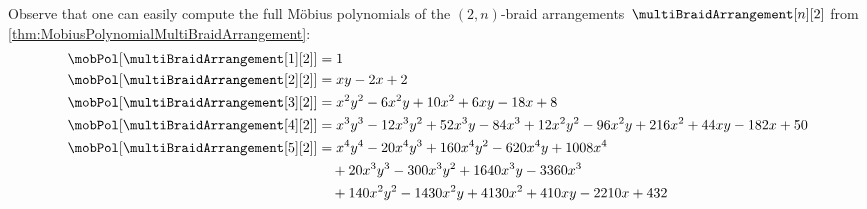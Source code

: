 Observe that one can easily compute the full M\"obius polynomials of the $(2,n)$-braid arrangements~$\multiBraidArrangement[n][2]$ from \cref{thm:MobiusPolynomialMultiBraidArrangement}:
\begin{align*}
\mobPol[{\multiBraidArrangement[1][2]}] & = 1 \\
\mobPol[{\multiBraidArrangement[2][2]}] & = x y - 2 x + 2 \\
\mobPol[{\multiBraidArrangement[3][2]}] & = x^2 y^2 - 6 x^2 y + 10 x^2 + 6 x y - 18 x + 8 \\
\mobPol[{\multiBraidArrangement[4][2]}] & = x^3 y^3 - 12 x^3 y^2 + 52 x^3 y - 84 x^3 + 12 x^2 y^2 - 96 x^2 y + 216 x^2 + 44 x y - 182 x + 50 \\
\mobPol[{\multiBraidArrangement[5][2]}] & = x^4 y^4 - 20 x^4 y^3 + 160 x^4 y^2 - 620 x^4 y + 1008 x^4 \\ & \quad+ 20 x^3 y^3 - 300 x^3 y^2 + 1640 x^3 y - 3360 x^3 \\ & \quad+ 140 x^2 y^2 - 1430 x^2 y + 4130 x^2 + 410 x y - 2210 x + 432
\end{align*}
